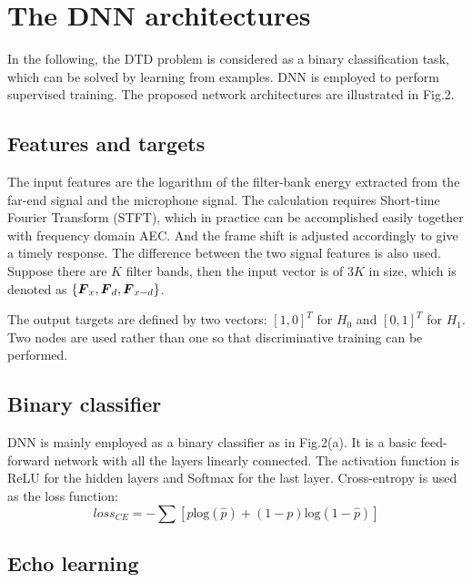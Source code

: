 \documentclass[a4paper]{article}
\begin{document}
\section{The DNN architectures}

In the following, the DTD problem is considered as a binary classification task, which can be solved by learning from examples. DNN is employed to perform supervised training. The proposed network architectures are illustrated in Fig.2.

\subsection{Features and targets}

The input features are the logarithm of the filter-bank energy extracted from the far-end signal and the microphone signal. The calculation requires Short-time Fourier Transform (STFT), which in practice can be accomplished easily together with frequency domain AEC. And the frame shift is adjusted accordingly to give a timely response. The difference between the two signal features is also used. Suppose there are $K$ filter bands, then the input vector is of $3K$ in size, which is denoted as $\{\bm{{F}}_x, \bm{{F}}_d, \bm{{F}}_{x-d}\}$.

The output targets are defined by two vectors: $[1,0]^T$ for $H_0$ and $[0,1]^T$ for $H_1$. Two nodes are used rather than one so that discriminative training can be performed.

\subsection{Binary classifier}

DNN is mainly employed as a binary classifier as in Fig.2(a). It is a basic feed-forward network with all the layers linearly connected. The activation function is ReLU for the hidden layers and Softmax for the last layer. Cross-entropy is used as the loss function:
\begin{equation}\label{eq:ce}
  loss_{CE}=-\sum [p\text{log}(\hat{p})+(1-p)\text{log}(1-\hat{p})]
\end{equation}

\subsection{Echo learning}
\end{document}
